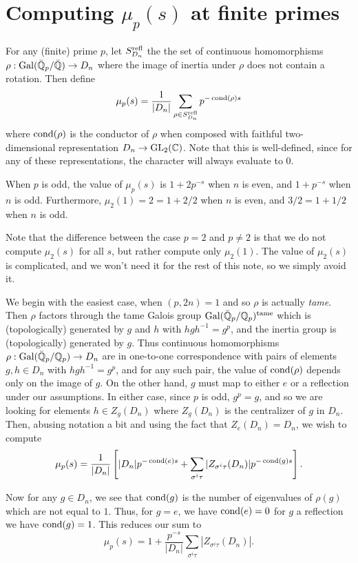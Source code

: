 \section{Computing $\mu_p(s)$ at finite primes}\label{sec:finiteprimes}

For any (finite) prime $p$, let $S_{D_n}^{\mathrm{refl}}$ the the set of continuous homomorphisms
$\rho : \operatorname{Gal}(\Bar{\mathbb{Q}}_p/\Bar{\mathbb{Q}}) \to D_n$ where the image of inertia under $\rho$ does not contain a rotation. Then define
\[ \mu_p(s) = \frac{1}{|D_n|} \sum_{\rho \in S_{D_n}^{\mathrm{refl}}} p^{-\operatorname{cond}(\rho)s} \]
where $\operatorname{cond}(\rho)$ is the conductor of $\rho$ when composed with faithful
two-dimensional representation $D_n \to \operatorname{GL}_2(\mathbb{C})$. Note that this is
well-defined, since for any of these representations, the character will always
evaluate to $0$.

\begin{prop}\label{prop:finiteprimes}
  When $p$ is odd, the value of $\mu_p(s)$ is $1 + 2p^{-s}$ when $n$ is even,
and $1 + p^{-s}$ when $n$ is odd. Furthermore, $\mu_2(1) = 2 = 1 + 2/2$ when
$n$ is even, and $3/2 = 1 + 1/2$ when $n$ is odd.
\end{prop}

Note that the difference between the case $p = 2$ and $p \ne 2$ is that we do
not compute $\mu_2(s)$ for all $s$, but rather compute only $\mu_2(1)$. The
value of $\mu_2(s)$ is complicated, and we won't need it for the rest of this
note, so we simply avoid it.

We begin with the easiest case, when $(p, 2n) = 1$ and so $\rho$ is actually
{\em tame}.  Then $\rho$ factors through the tame Galois group
$\operatorname{Gal}(\Bar{\mathbb{Q}}_p/\mathbb{Q}_p)^{\mathrm{tame}}$ which is (topologically) generated by $g$ and $h$
with $hgh^{-1} = g^p$, and the inertia group is (topologically) generated by
$g$. Thus continuous homomorphisms $\rho : \operatorname{Gal}(\Bar{\mathbb{Q}}_p/\mathbb{Q}_p) \to D_n$ are in
one-to-one correspondence with pairs of elements $g, h \in D_n$ with $hgh^{-1}
= g^p$, and for any such pair, the value of $\operatorname{cond}(\rho)$ depends only on the
image of $g$.  On the other hand, $g$ must map to either $e$ or a reflection
under our assumptions. In either case, since $p$ is odd, $g^p = g$, and so we
are looking for elements $h \in Z_g(D_n)$ where $Z_g(D_n)$ is the centralizer
of $g$ in $D_n$. Then, abusing notation a bit and using the fact that $Z_e(D_n) = D_n$, we wish to compute
\[ \mu_p(s) = \frac{1}{|D_n|} \left[ |D_n| p^{-\operatorname{cond}(e) s} + \sum_{\sigma^i\tau} |Z_{\sigma^i\tau}(D_n)| p^{-\operatorname{cond}(g) s}\right]. \]

Now for any $g \in D_n$, we see that $\operatorname{cond}(g)$ is the number of eigenvalues of
$\rho(g)$ which are not equal to $1$. Thus, for $g = e$, we have $\operatorname{cond}(e) = 0$
for $g$ a reflection we have $\operatorname{cond}(g) = 1$. This reduces our sum to
\[ \mu_p(s) = 1 + \frac{p^{-s}}{|D_n|} \sum_{\sigma^i\tau} |Z_{\sigma^i\tau}(D_n)|. \]

